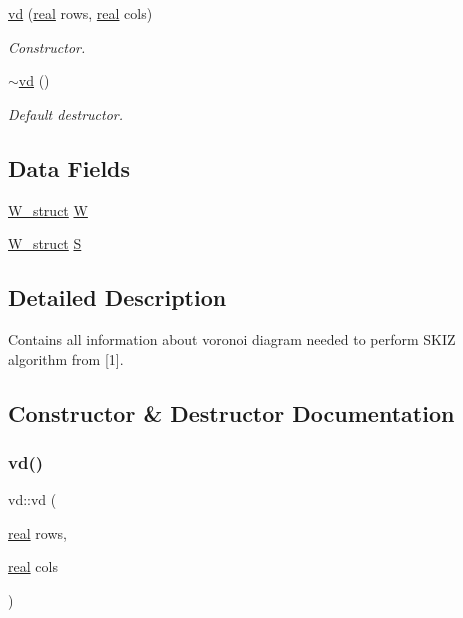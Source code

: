 \begin{DoxyCompactItemize}
\mbox{\hyperlink{classvd_a765c16ee377a2a0f9651d555edd3a158}{vd}} (\mbox{\hyperlink{typedefs_8h_a58a0c7cf2501f4492da833421be92547}{real}} rows, \mbox{\hyperlink{typedefs_8h_a58a0c7cf2501f4492da833421be92547}{real}} cols)
\begin{DoxyCompactList}\small\item\em Constructor. \end{DoxyCompactList}\item 
\mbox{\hyperlink{classvd_a331bc7a75e3f5ea3b750d1d22a9df287}{$\sim$vd}} ()
\begin{DoxyCompactList}\small\item\em Default destructor. \end{DoxyCompactList}\end{DoxyCompactItemize}
\subsection*{Data Fields}
\begin{DoxyCompactItemize}
\item 
\mbox{\hyperlink{structW__struct}{W\+\_\+struct}} \mbox{\hyperlink{classvd_ab23d33e6c11c46ad3302a874a4726542}{W}}
\item 
\mbox{\hyperlink{structW__struct}{W\+\_\+struct}} \mbox{\hyperlink{classvd_a960c80ec5b52938f999f528a5e3cccf1}{S}}
\end{DoxyCompactItemize}


\subsection{Detailed Description}
Contains all information about voronoi diagram needed to perform S\+K\+IZ algorithm from \mbox{[}1\mbox{]}. 

\subsection{Constructor \& Destructor Documentation}
\mbox{\label{classvd_a765c16ee377a2a0f9651d555edd3a158}} 
\subsubsection{\texorpdfstring{vd()}{vd()}}
{\footnotesize\ttfamily vd\+::vd (\begin{DoxyParamCaption}\item[{\mbox{\hyperlink{typedefs_8h_a58a0c7cf2501f4492da833421be92547}{real}}}]{rows,  }\item[{\mbox{\hyperlink{typedefs_8h_a58a0c7cf2501f4492da833421be92547}{real}}}]{cols }\end{DoxyParamCaption})}



